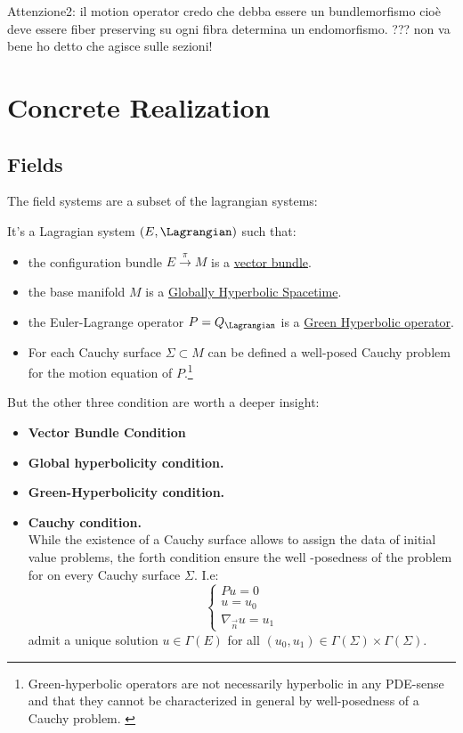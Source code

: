 \documentclass[Main]{subfiles}
\begin{document}
		Attenzione2: il motion operator credo che debba essere un bundlemorfismo cioè deve essere fiber preserving su ogni fibra determina un endomorfismo. ??? non va bene ho detto che agisce sulle sezioni!

	\section{Concrete Realization}
		\subsection{Fields}
			The field systems are a subset of the lagrangian systems:
			\begin{definition}
				It's a Lagragian system $(E,\Lagrangian)$ such that:
				\begin{itemize}
					\item the configuration bundle $E\xrightarrow{\pi} M$ is a \underline{vector bundle}.
					\item the base manifold $M$ is a \underline{Globally Hyperbolic Spacetime}.
					\item the Euler-Lagrange operator $P= Q_\Lagrangian$ is a \underline{Green Hyperbolic operator}.
					\item For each Cauchy surface $\Sigma \subset M$ can be defined a well-posed Cauchy problem for the motion equation of $P$.\footnote{Green-hyperbolic operators are not necessarily hyperbolic in any PDE-sense and that they cannot be characterized in general by well-posedness of a Cauchy problem. \cite{Terlaky2010} \cite{Bar2010}}
				\end{itemize}
			\end{definition}
		But the other three condition are worth a deeper insight:
		\begin{itemize}
			\item 	\textbf{Vector Bundle Condition}
			\item 	\textbf{Global hyperbolicity condition.}
			\item 	\textbf{Green-Hyperbolicity condition.}
			\item 	\textbf{Cauchy condition.}\\
					While the existence of a Cauchy surface allows to assign the data of initial value problems, the forth condition ensure the well -posedness of the problem for on every Cauchy surface $\Sigma$. I.e:
					\begin{equation}\label{CauchyProblem}
							\begin{cases} P u = 0 \\ u = u_0 \\ \nabla_{\vec{n}}u= u_1 \end{cases}
					\end{equation}
					admit a unique solution $u\in \Gamma(E)$ for all $(u_0, u_1) \in \Gamma (\Sigma )\times \Gamma (\Sigma )$.		
		\end{itemize}
\end{document}
